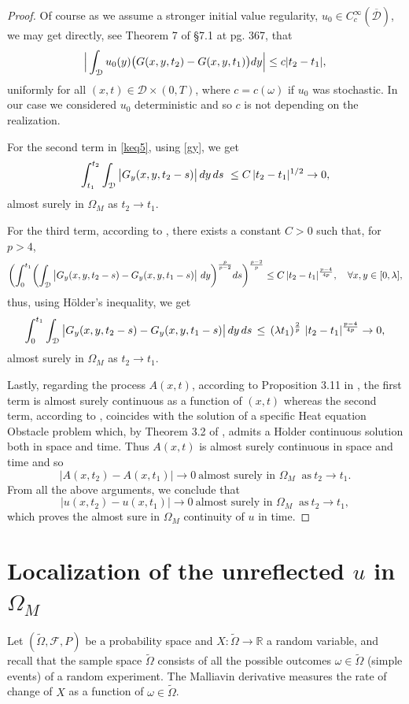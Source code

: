 \documentclass[reqno]{amsart}
\numberwithin{equation}{section}
\newcommand{\mR}{\mathbb{R}}
\newcommand{\um}[1]{$\ddot{\text{#1}}$}
\newcommand{\om}{\omega}
\newcommand{\cd}{\mathcal{D}}
\begin{document}
\begin{proof}
Of course as we assume a stronger initial value regularity, $u_0\in C_c^{\infty}(\overline{\mathcal{D}})$, we may get directly, see \cite{Evans} Theorem 7 of \S7.1 at pg. 367, that $$\Big{|}\int_{\cd}u_0(y)\big(G(x,y,t_2)-G(x,y,t_1)\big)
dy\Big{|}\leq c|t_2-t_1|,$$ uniformly for all $(x,t)\in\mathcal{D}\times (0,T)$, where $c=c(\omega)$ if $u_0$ was stochastic. In our case we considered $u_0$ deterministic and so $c$ is not depending on the realization.


For the second term in \eqref{keq5}, using \eqref{gy}, we get
\begin{align*}
\int_{t_1}^{t_2}\int_{\mathcal{D}}\big{|}G_y(x,y,t_2-s)\big{|}\, dy\,ds\ \leq C\, |t_2-t_1|^{1/2}\rightarrow 0 ,
\end{align*}
almost surely in $\Omega_M$ as $ t_2\rightarrow t_1$.

For the third term, according to \cite[Proposition A.6]{BH2}, there exists a constant $ C>0$ such that, for
$p>4$,
\begin{align*}
\biggl{(}\int_0^{t_1}\biggl{(}\int_{\mathcal{D}}\big{|}G_y(x,y,t_2-s)-G_y(x,y,t_1-s)\big{|}\ dy\biggr{)}^{\frac{p}{p-2}}ds\biggr{)}^{\frac{p-2}{p}}\leq C\, |t_2-t_1|^{\frac{p-4}{4p}} , \quad \forall x, y \in[0,\lambda] ,
\end{align*}
thus, using H\"older's inequality, we get
$$\int_0^{t_1}\int_{\mathcal{D}}\big{|}G_y(x,y,t_2-s) -G_y(x,y,t_1-s)\big{|}\,dy\,ds\, \leq \, (\lambda t_1)^{\frac{2}{p}}\ |t_2-t_1|^{\frac{p-4}{4p}}\rightarrow 0 , $$
almost surely in $\Omega_M$ as $t_2\rightarrow t_{1}$.

Lastly, regarding the process $A(x,t)$, according to Proposition
3.11 in \cite{BH2}, the first term is almost surely continuous as a function of
$(x,t)$ whereas the second term, according to \cite{AFK2}, coincides with the solution of a specific
Heat equation Obstacle problem which, by Theorem 3.2 of \cite{BH}, admits a H\um{o}lder continuous solution both in space and time. Thus $A(x,t)$ is almost surely continuous in space and time
and so
$$|A(x,t_2)-A(x,t_1)|\rightarrow0\ \text{almost surely in }\Omega_M\;\;\mbox{as}\  t_2\rightarrow t_1.$$
From all the above arguments, we conclude that
$$|u(x,t_2)-u(x,t_1)|\rightarrow 0\ \text{almost surely in }\Omega_M\;\;\mbox{as}\
t_2\rightarrow t_1 , $$ which proves the almost sure in
$\Omega_M$ continuity of $u$ in time.
\end{proof}


\section{Localization of the unreflected $u$ in $\Omega_M$} Let $(\tilde{\Omega},\mathcal{F},P)$ be a probability space and $X:\tilde{\Omega}\rightarrow\mR$ a random variable, and recall that the sample space $\tilde{\Omega}$ consists of  all the possible outcomes $\om\in\tilde{\Omega}$ (simple events) of a random experiment. The Malliavin derivative measures the rate of change of $X$ as a function of $\om\in\tilde{\Omega}$.
\end{document}
